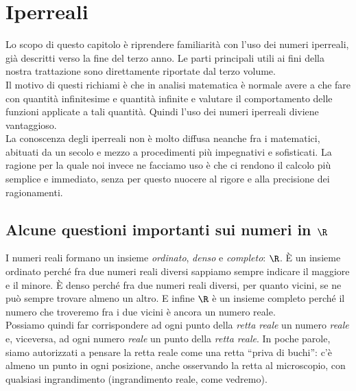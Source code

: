 



\chapter{Iperreali}
\label{sec:01_introduzione}
Lo scopo di questo capitolo è riprendere familiarità con l'uso 
dei numeri iperreali, già descritti verso la fine del terzo anno. 
Le parti principali utili ai fini della nostra trattazione sono 
direttamente riportate dal terzo volume.\\
Il motivo di questi richiami è che in analisi matematica è normale 
avere a che fare con quantità infinitesime e quantità infinite e 
valutare il comportamento delle funzioni applicate a tali quantità. 
Quindi l'uso dei numeri iperreali diviene vantaggioso.\\
La conoscenza degli iperreali non è molto diffusa neanche fra i matematici, 
abituati da un secolo e mezzo a procedimenti più impegnativi e sofisticati.
La ragione per la quale noi invece ne facciamo uso è che ci rendono il 
calcolo 
più semplice e immediato, senza per questo nuocere al rigore e alla 
precisione dei ragionamenti.

\section{Alcune questioni importanti sui numeri in \(\R\)}
\label{sec:insnum_reali}

I numeri reali formano un insieme \emph{ordinato}, \emph{denso} e 
\emph{completo}: \(\R\). È un insieme ordinato perché fra due numeri reali
diversi sappiamo sempre indicare il maggiore e il minore. È denso
perché fra due numeri reali diversi, per quanto vicini, se ne può 
sempre trovare almeno un altro. E infine \(\R\) è un insieme completo 
perché il numero che troveremo fra i due vicini è ancora un numero reale.\\
Possiamo quindi far corrispondere ad ogni punto della \emph{retta reale} un 
numero \emph{reale} e, viceversa, ad ogni numero \emph{reale} un punto 
della \emph{retta reale}. In poche parole, siamo
autorizzati a pensare la retta reale come una retta ``priva di buchi'':
c'è almeno un punto in ogni posizione, anche osservando la retta al 
microscopio, con qualsiasi ingrandimento (ingrandimento reale, come 
vedremo).

